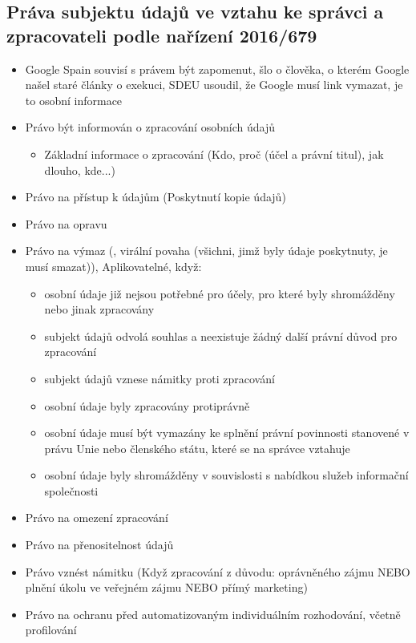 \subsection{Práva subjektu údajů ve vztahu ke správci a zpracovateli podle nařízení 2016/679}
\begin{itemize}
    \item Google Spain souvisí s právem být zapomenut, šlo o člověka, o kterém Google našel staré články o exekuci, SDEU usoudil, že Google musí link vymazat, je to osobní informace
    \item Právo být informován o zpracování osobních údajů
    \begin{itemize}
        \item Základní informace o zpracování (Kdo, proč (účel a právní titul), jak dlouho, kde...)
    \end{itemize}
    \item Právo na přístup k údajům (Poskytnutí kopie údajů)
    \item Právo na opravu
    \item Právo na výmaz (, virální povaha (všichni, jimž byly údaje poskytnuty, je musí smazat)), Aplikovatelné, když:
    \begin{itemize}
        \item osobní údaje již nejsou potřebné pro účely, pro které byly shromážděny nebo jinak zpracovány
        \item subjekt údajů odvolá souhlas a neexistuje žádný další právní důvod pro zpracování
        \item subjekt údajů vznese námitky proti zpracování 
        \item osobní údaje byly zpracovány protiprávně
        \item osobní údaje musí být vymazány ke splnění právní povinnosti stanovené v právu Unie nebo členského státu, které se na správce vztahuje
        \item osobní údaje byly shromážděny v souvislosti s nabídkou služeb informační společnosti
    \end{itemize}
    \item Právo na omezení zpracování 
    \item Právo na přenositelnost údajů 
    \item Právo vznést námitku (Když zpracování z důvodu: oprávněného zájmu NEBO plnění úkolu ve veřejném zájmu NEBO přímý marketing)
    \item Právo na ochranu před automatizovaným individuálním rozhodování, včetně profilování 
\end{itemize}
